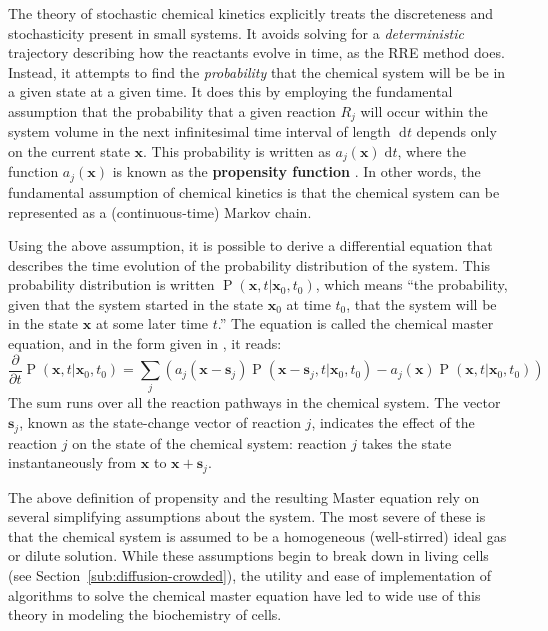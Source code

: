 \documentclass[english,letterpaper,12pt]{article}
\newcommand{\defkeywd}[1]{\textbf{#1}}
\newcommand{\dee}{\;\mathrm{d}}
\renewcommand{\vec}[1]{\ensuremath{\mathbf{#1}}}
\DeclareMathOperator{\Prob}{P}
\begin{document}
\begin{doublespacing}
The theory of stochastic chemical kinetics explicitly treats the discreteness and stochasticity present in small systems. It avoids solving for a \emph{deterministic} trajectory describing how the reactants evolve in time, as the RRE method does. Instead, it attempts to find the \emph{probability} that the chemical system will be be in a given state at a given time. It does this by employing the fundamental assumption that the probability that a given reaction $R_j$ will occur within the system volume in the next infinitesimal time interval of length $\dee t$ depends only on the current state $\vec{x}$. This probability is written as $a_j(\vec{x}) \dee t$, where the function $a_j(\vec{x})$ is known as the \defkeywd{propensity function} \cite{gillespie-ssa}. In other words, the fundamental assumption of chemical kinetics is that the chemical system can be represented as a (continuous-time) Markov chain.

Using the above assumption, it is possible to derive a differential equation that describes the time evolution of the probability distribution of the system. This probability distribution is written $\Prob(\vec{x}, t | \vec{x}_0, t_0)$, which means ``the probability, given that the system started in the state $\vec{x}_0$ at time $t_0$, that the system will be in the state $\vec{x}$ at some later time $t$.'' The equation is called the chemical master equation, and in the form given in \cite{gillespie-ssa}, it reads:
\begin{equation}
    \frac{\partial}{\partial t} \Prob(\vec{x}, t | \vec{x}_0, t_0) = \sum_j \left( a_j (\vec{x} - \vec{s}_j) \Prob(\vec{x} - \vec{s}_j, t | \vec{x}_0, t_0) - a_j(\vec{x}) \Prob(\vec{x}, t | \vec{x}_0, t_0) \right)
    \label{eq:master-eqn}
\end{equation}
The sum runs over all the reaction pathways in the chemical system. The vector $\vec{s}_j$, known as the state-change vector of reaction $j$, indicates the effect of the reaction $j$ on the state of the chemical system: reaction $j$ takes the state instantaneously from $\vec{x}$ to $\vec{x} + \vec{s}_j$.

The above definition of propensity and the resulting Master equation rely on several simplifying assumptions about the system. The most severe of these is that the chemical system is assumed to be a homogeneous (well-stirred) ideal gas or dilute solution.  While these assumptions begin to break down in living cells (see Section~\ref{sub:diffusion-crowded}), the utility and ease of implementation of algorithms to solve the chemical master equation have led to wide use of this theory in modeling the biochemistry of cells. 


\end{doublespacing}
\end{document}
